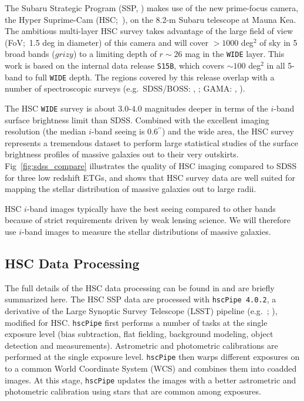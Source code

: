 \documentclass[a4paper,fleqn,usenatbib]{mnras}
\def\asec{$^{\prime\prime}$}
\begin{document}
    The Subaru Strategic Program (SSP, \citealt{HSC_SSP, HSC_DR1}) makes use of the 
    new prime-focus camera, the Hyper Suprime-Cam (HSC;~\citealt{Miyazaki2012}), on the 
    8.2-m Subaru telescope at Mauna Kea. 
    The ambitious multi-layer HSC survey takes advantage of the large field of 
    view (FoV;~1.5 deg in diameter) of this camera and will cover $>1000$ deg$^2$ 
    of sky in 5 broad bands ($grizy$) to a limiting depth of $r {\sim} 26$ mag 
    in the \texttt{WIDE} layer. 
    This work is based on the internal data release \texttt{S15B}, which covers 
    ${\sim} 100$ deg$^2$ in all 5-band to full \texttt{WIDE} depth.  
    The regions covered by this release overlap with a number of spectroscopic surveys 
    (e.g.\ SDSS/BOSS: \citealt{Eisenstein2011}, \citealt{Alam2015}; 
    GAMA: \citealt{Driver2011}, \citealt{Liske2015}).

    The HSC \texttt{WIDE} survey is about $3.0$-$4.0$ magnitudes deeper in terms of the $i$-band surface brightness limit than SDSS. Combined with the excellent imaging resolution (the median $i$-band seeing is 
    0.6\asec) and the wide area, the HSC survey represents a tremendous dataset to 
    perform large statistical studies of the surface brightness profiles of massive
    galaxies out to their very outskirts.     
    Fig~\ref{fig:sdss_compare} illustrates the quality of HSC imaging compared to SDSS 
    for three low redshift ETGs, and shows that HSC survey data are well suited for 
    mapping the stellar distribution of massive galaxies out to large radii.

	HSC $i$-band images typically have the best seeing compared to other bands because 
	of strict requirements driven by weak lensing science. 
    We will therefore use $i$-band images to measure the stellar distributions of 
    massive galaxies.
    
\subsection{HSC Data Processing}
    \label{sec:pipeline}

    The full details of the HSC data processing can be found in \citet{Bosch2017}
    and are briefly summarized here. 
    The HSC SSP data are processed with \texttt{hscPipe 4.0.2}, a derivative of the 
    Large Synoptic Survey Telescope (LSST) pipeline (e.g.\ \citealt{Juric2015}; 
    \citealt{Axelrod2010}), modified for HSC. 
    \texttt{hscPipe} first performs a number of tasks at the single exposure level 
    (bias subtraction, flat fielding, background modeling, object detection and 
    measurements). 
    Astrometric and photometric calibrations are performed at the single exposure 
    level. 
    \texttt{hscPipe} then warps different exposures on to a common World Coordinate 
    System (WCS) and combines them into coadded images. 
    At this stage, \texttt{hscPipe} updates the images with a better astrometric and 
    photometric calibration using stars that are common among exposures. 
    
\end{document}
